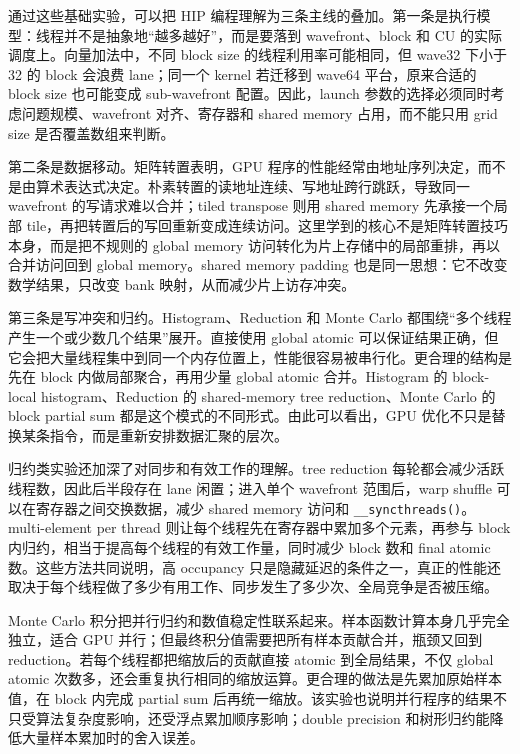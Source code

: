 \documentclass[10pt,a4paper]{article}
\begin{document}
通过这些基础实验，可以把 HIP 编程理解为三条主线的叠加。第一条是执行模型：线程并不是抽象地“越多越好”，而是要落到 wavefront、block 和 CU 的实际调度上。向量加法中，不同 block size 的线程利用率可能相同，但 wave32 下小于 32 的 block 会浪费 lane；同一个 kernel 若迁移到 wave64 平台，原来合适的 block size 也可能变成 sub-wavefront 配置。因此，launch 参数的选择必须同时考虑问题规模、wavefront 对齐、寄存器和 shared memory 占用，而不能只用 grid size 是否覆盖数组来判断。

第二条是数据移动。矩阵转置表明，GPU 程序的性能经常由地址序列决定，而不是由算术表达式决定。朴素转置的读地址连续、写地址跨行跳跃，导致同一 wavefront 的写请求难以合并；tiled transpose 则用 shared memory 先承接一个局部 tile，再把转置后的写回重新变成连续访问。这里学到的核心不是矩阵转置技巧本身，而是把不规则的 global memory 访问转化为片上存储中的局部重排，再以合并访问回到 global memory。shared memory padding 也是同一思想：它不改变数学结果，只改变 bank 映射，从而减少片上访存冲突。

第三条是写冲突和归约。Histogram、Reduction 和 Monte Carlo 都围绕“多个线程产生一个或少数几个结果”展开。直接使用 global atomic 可以保证结果正确，但它会把大量线程集中到同一个内存位置上，性能很容易被串行化。更合理的结构是先在 block 内做局部聚合，再用少量 global atomic 合并。Histogram 的 block-local histogram、Reduction 的 shared-memory tree reduction、Monte Carlo 的 block partial sum 都是这个模式的不同形式。由此可以看出，GPU 优化不只是替换某条指令，而是重新安排数据汇聚的层次。

归约类实验还加深了对同步和有效工作的理解。tree reduction 每轮都会减少活跃线程数，因此后半段存在 lane 闲置；进入单个 wavefront 范围后，warp shuffle 可以在寄存器之间交换数据，减少 shared memory 访问和 \texttt{\_\_syncthreads()}。multi-element per thread 则让每个线程先在寄存器中累加多个元素，再参与 block 内归约，相当于提高每个线程的有效工作量，同时减少 block 数和 final atomic 数。这些方法共同说明，高 occupancy 只是隐藏延迟的条件之一，真正的性能还取决于每个线程做了多少有用工作、同步发生了多少次、全局竞争是否被压缩。

Monte Carlo 积分把并行归约和数值稳定性联系起来。样本函数计算本身几乎完全独立，适合 GPU 并行；但最终积分值需要把所有样本贡献合并，瓶颈又回到 reduction。若每个线程都把缩放后的贡献直接 atomic 到全局结果，不仅 global atomic 次数多，还会重复执行相同的缩放运算。更合理的做法是先累加原始样本值，在 block 内完成 partial sum 后再统一缩放。该实验也说明并行程序的结果不只受算法复杂度影响，还受浮点累加顺序影响；double precision 和树形归约能降低大量样本累加时的舍入误差。
\end{document}
